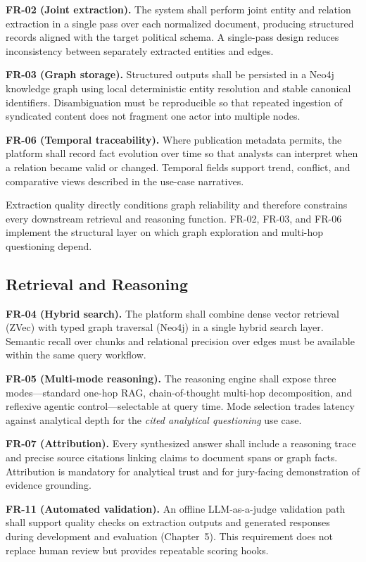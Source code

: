 \textbf{FR-02 (Joint extraction).} The system shall perform joint entity and relation extraction in a single pass over each normalized document, producing structured records aligned with the target political schema. A single-pass design reduces inconsistency between separately extracted entities and edges.

\textbf{FR-03 (Graph storage).} Structured outputs shall be persisted in a Neo4j knowledge graph using local deterministic entity resolution and stable canonical identifiers. Disambiguation must be reproducible so that repeated ingestion of syndicated content does not fragment one actor into multiple nodes.

\textbf{FR-06 (Temporal traceability).} Where publication metadata permits, the platform shall record fact evolution over time so that analysts can interpret when a relation became valid or changed. Temporal fields support trend, conflict, and comparative views described in the use-case narratives.

Extraction quality directly conditions graph reliability and therefore constrains every downstream retrieval and reasoning function. FR-02, FR-03, and FR-06 implement the structural layer on which graph exploration and multi-hop questioning depend.

\subsection{Retrieval and Reasoning}

\textbf{FR-04 (Hybrid search).} The platform shall combine dense vector retrieval (ZVec) with typed graph traversal (Neo4j) in a single hybrid search layer. Semantic recall over chunks and relational precision over edges must be available within the same query workflow.

\textbf{FR-05 (Multi-mode reasoning).} The reasoning engine shall expose three modes---standard one-hop RAG, chain-of-thought multi-hop decomposition, and reflexive agentic control---selectable at query time. Mode selection trades latency against analytical depth for the \emph{cited analytical questioning} use case.

\textbf{FR-07 (Attribution).} Every synthesized answer shall include a reasoning trace and precise source citations linking claims to document spans or graph facts. Attribution is mandatory for analytical trust and for jury-facing demonstration of evidence grounding.

\textbf{FR-11 (Automated validation).} An offline LLM-as-a-judge validation path shall support quality checks on extraction outputs and generated responses during development and evaluation (Chapter~5). This requirement does not replace human review but provides repeatable scoring hooks.

